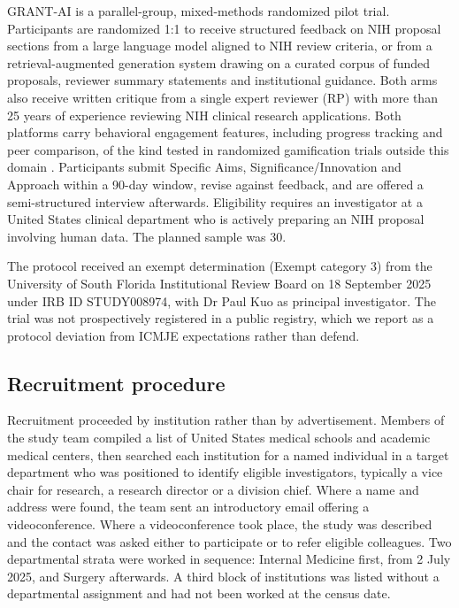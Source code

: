 \documentclass[11pt,a4paper]{article}
\begin{document}
GRANT-AI is a parallel-group, mixed-methods randomized pilot trial. Participants are randomized 1:1 to receive structured feedback on NIH proposal sections from a large language model aligned to NIH review criteria, or from a retrieval-augmented generation system drawing on a curated corpus of funded proposals, reviewer summary statements and institutional guidance. Both arms also receive written critique from a single expert reviewer (RP) with more than 25 years of experience reviewing NIH clinical research applications. Both platforms carry behavioral engagement features, including progress tracking and peer comparison, of the kind tested in randomized gamification trials outside this domain \cite{r27}. Participants submit Specific Aims, Significance/Innovation and Approach within a 90-day window, revise against feedback, and are offered a semi-structured interview afterwards. Eligibility requires an investigator at a United States clinical department who is actively preparing an NIH proposal involving human data. The planned sample was 30.

The protocol received an exempt determination (Exempt category 3) from the University of South Florida Institutional Review Board on 18 September 2025 under IRB ID STUDY008974, with Dr Paul Kuo as principal investigator. The trial was not prospectively registered in a public registry, which we report as a protocol deviation from ICMJE expectations rather than defend.

\subsection{Recruitment procedure}

Recruitment proceeded by institution rather than by advertisement. Members of the study team compiled a list of United States medical schools and academic medical centers, then searched each institution for a named individual in a target department who was positioned to identify eligible investigators, typically a vice chair for research, a research director or a division chief. Where a name and address were found, the team sent an introductory email offering a videoconference. Where a videoconference took place, the study was described and the contact was asked either to participate or to refer eligible colleagues. Two departmental strata were worked in sequence: Internal Medicine first, from 2 July 2025, and Surgery afterwards. A third block of institutions was listed without a departmental assignment and had not been worked at the census date.
\end{document}

